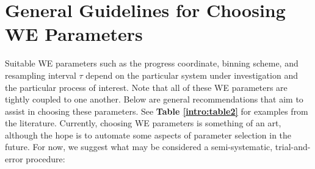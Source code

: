 \section{General Guidelines for Choosing WE Parameters}
\label{intro:general-guidelines}
Suitable WE parameters such as the progress coordinate, binning scheme, and resampling interval $\tau$ depend on the particular system under investigation and the particular process of interest. 
Note that all of these WE parameters are tightly coupled to one another. Below are general recommendations that aim to assist in choosing these parameters. 
See \textbf{Table \ref{intro:table2}} for examples from the literature. 
Currently, choosing WE parameters is something of an art, although the hope is to automate some aspects of parameter selection in the future. 
For now, we suggest what may be considered a semi-systematic, trial-and-error procedure:

